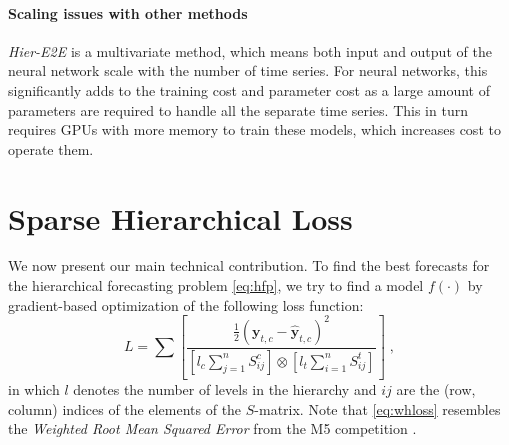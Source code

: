 \documentclass[preprint, 3p, times, twocolumn]{elsarticle}
\begin{document}
\paragraph{Scaling issues with other methods} \label{sec:scalingissuesneuralmethods} \textit{Hier-E2E} \cite{rangapuram_endtoend_2021} is a multivariate method, which means both input and output of the neural network scale with the number of time series. For neural networks, this significantly adds to the training cost and parameter cost as a large amount of parameters are required to handle all the separate time series. This in turn requires GPUs with more memory to train these models, which increases cost to operate them. 

\section{Sparse Hierarchical Loss} \label{sec:sparsehloss}
We now present our main technical contribution. To find the best forecasts for the hierarchical forecasting problem \eqref{eq:hfp}, we try to find a model \(f(\cdot)\) by gradient-based optimization of the following loss function:
\begin{equation} \label{eq:whloss}
  L = \sum \left[ \frac{ \frac{1}{2}(\textbf{y}_{t, c} - \hat{\textbf{y}}_{t, c})^2}{ \left[ l_{c} \sum_{j=1}^n S^c_{ij} \right] \otimes \left[ l_{t} \sum_{i=1}^n S^t_{ij} \right] } \right] \; ,
\end{equation}
in which \(l\) denotes the number of levels in the hierarchy and \(ij\) are the (row, column) indices of the elements of the \(S\)-matrix. Note that \eqref{eq:whloss} resembles the \textit{Weighted Root Mean Squared Error} from the M5 competition \cite{makridakis_m5_2022}.
\end{document}
